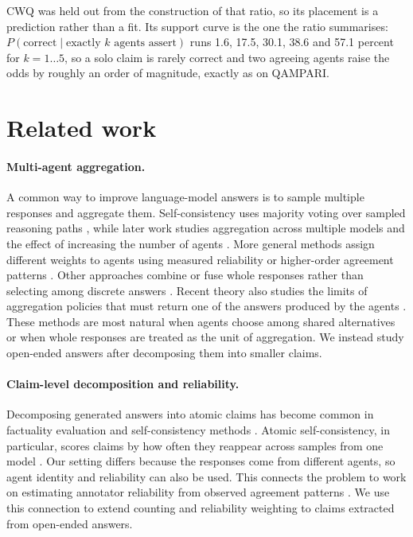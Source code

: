 \documentclass{article}
\begin{document}
CWQ was held out from the construction of that ratio, so its placement is a prediction rather than a fit. Its support curve is the one the ratio summarises: $P(\mathrm{correct} \mid \text{exactly } k \text{ agents assert})$ runs 1.6, 17.5, 30.1, 38.6 and 57.1 percent for $k = 1 \dots 5$, so a solo claim is rarely correct and two agreeing agents raise the odds by roughly an order of magnitude, exactly as on QAMPARI.

\section{Related work}
\label{sec:related}

\paragraph{Multi-agent aggregation.}
A common way to improve language-model answers is to sample multiple responses and aggregate them. Self-consistency uses majority voting over sampled reasoning paths \cite{wang2022self}, while later work studies aggregation across multiple models and the effect of increasing the number of agents \cite{li2024agents}. More general methods assign different weights to agents using measured reliability or higher-order agreement patterns \cite{ai2025majority}. Other approaches combine or fuse whole responses rather than selecting among discrete answers \cite{jiang2023llm,chen2023universal}. Recent theory also studies the limits of aggregation policies that must return one of the answers produced by the agents \cite{ananthakrishnan2026power}. These methods are most natural when agents choose among shared alternatives or when whole responses are treated as the unit of aggregation. We instead study open-ended answers after decomposing them into smaller claims.

\paragraph{Claim-level decomposition and reliability.}
Decomposing generated answers into atomic claims has become common in factuality evaluation and self-consistency methods \cite{thirukovalluru2024atomic,zhang2024atomic,ning2025mad,wan2025fastfact,liu2025verifact,goel2025zero,panou2025harnessing}. Atomic self-consistency, in particular, scores claims by how often they reappear across samples from one model \cite{thirukovalluru2024atomic}. Our setting differs because the responses come from different agents, so agent identity and reliability can also be used. This connects the problem to work on estimating annotator reliability from observed agreement patterns \cite{dawid1979maximum,sinha2018fast,majdi2023crowd,kuzin2025improving}. We use this connection to extend counting and reliability weighting to claims extracted from open-ended answers.
\end{document}
